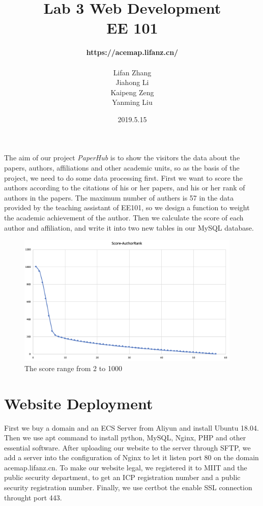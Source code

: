 \documentclass{article}
\begin{document}
	\title{Lab 3 Web Development \\ EE 101} 
	\author{\Large{\textbf{https://acemap.lifanz.cn/}}\\ \\Lifan Zhang\\Jiahong Li\\Kaipeng Zeng\\Yanming Liu} 
	\date{2019.5.15} 
	\maketitle 
	\tableofcontents
	\newpage
	\hspace*{0.5cm}
	The aim of our project \emph{PaperHub} is to show the visitors the data about the papers, authors, affiliations and
	other academic units, so as the basis of the project, we need to do some data processing first. First we want to score
	the authors according to the citations of his or her papers, and his or her rank of authors in the papers. The maximum 
	number of authers is 57 in the data provided by the teaching assistant of EE101, so we design a function to weight the 
	academic achievement of the author. Then we calculate the score of each author and affiliation, and write it into two
	new tables in our MySQL database.
	
	\begin{figure}[h]
		\begin{center}
			\includegraphics[width=0.95\textwidth]{zlf_1} %
			\caption{The score range from 2 to 1000}
		\end{center}
	\end{figure}
	
	\section{Website Deployment}
	\hspace*{0.5cm}
	First we buy a domain and an ECS Server from Aliyun and install Ubuntu 18.04. Then we use apt command to install python,
	MySQL, Nginx, PHP and other essential software. After uploading our website to the server through SFTP, we add a server 
	into the configuration of Nginx to let it listen port 80 on the domain acemap.lifanz.cn. To make our website legal, we 
	registered it to MIIT and the public security department, to get an ICP registration number and a public security 
	registration number. Finally, we use certbot the enable SSL connection throught port 443.
	
\end{document}
